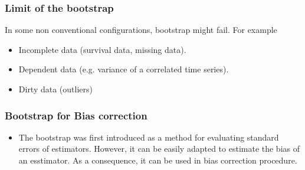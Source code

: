 \frame
{
\frametitle{Limit of the bootstrap}

\begin{block}{}
In some non conventional configurations, bootstrap might fail. For
example
\begin{itemize}
\item Incomplete data (survival data, missing data).
\item Dependent data (e.g. variance of a correlated time series).
\item Dirty data (outliers)
\end{itemize}
\end{block}
}




\frame
{
\frametitle{Bootstrap for Bias correction }


\begin{itemize}
\item The bootstrap was first introduced as a method for evaluating standard errors of estimators. However, it can be easily adapted to estimate the bias of an esstimator. As a consequence, it can be used in bias correction procedure.  
\end{itemize}

}

